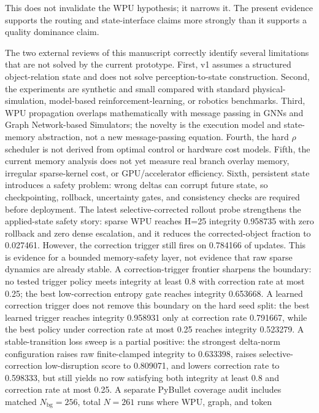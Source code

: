 \documentclass[11pt]{article}
\begin{document}
This does not invalidate the WPU hypothesis; it narrows it. The present
evidence supports the routing and state-interface claims more strongly than it
supports a quality dominance claim.

The two external reviews of this manuscript correctly identify several
limitations that are not solved by the current prototype. First, v1 assumes a
structured object-relation state and does not solve perception-to-state
construction. Second, the experiments are synthetic and small compared with
standard physical-simulation, model-based reinforcement-learning, or robotics
benchmarks. Third, WPU propagation overlaps mathematically with message passing
in GNNs and Graph Network-based Simulators; the novelty is the execution model
and state-memory abstraction, not a new message-passing equation. Fourth, the
hard \(\rho\) scheduler is not derived from optimal control or hardware cost
models. Fifth, the current memory analysis does not yet measure real branch
overlay memory, irregular sparse-kernel cost, or GPU/accelerator efficiency.
Sixth, persistent state introduces a safety problem: wrong deltas can corrupt
future state, so checkpointing, rollback, uncertainty gates, and consistency
checks are required before deployment. The latest selective-corrected rollout
probe strengthens the applied-state safety story: sparse WPU reaches H=25
integrity 0.958735 with zero rollback and zero dense escalation, and it reduces
the corrected-object fraction to 0.027461. However, the correction trigger still
fires on 0.784166 of updates. This is evidence for a bounded memory-safety
layer, not evidence that raw sparse dynamics are already stable. A
correction-trigger frontier sharpens the boundary: no tested trigger policy
meets integrity at least 0.8 with correction rate at most 0.25; the best
low-correction entropy gate reaches integrity 0.653668. A learned correction
trigger does not remove this boundary on the hard seed split: the best learned
trigger reaches integrity 0.958931 only at correction rate 0.791667, while the
best policy under correction rate at most 0.25 reaches integrity 0.523279. A
stable-transition loss sweep is a partial positive: the strongest delta-norm
configuration raises raw finite-clamped integrity to 0.633398, raises
selective-correction low-disruption score to 0.809071, and lowers correction
rate to 0.598333, but still yields no row satisfying both integrity at least
0.8 and correction rate at most 0.25.
A separate PyBullet coverage audit includes matched
\(N_{\mathrm{bg}}=256\), total \(N=261\) runs where WPU, graph, and token
\end{document}
